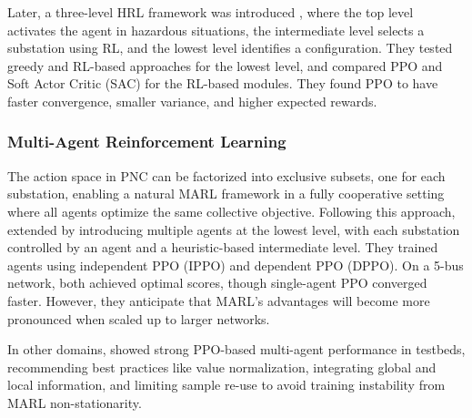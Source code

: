 Later, a three-level HRL framework was introduced \cite{manczak2023hierarchical}, where the top level activates the agent in hazardous situations, the intermediate level selects a substation using RL, and the lowest level identifies a configuration. They tested greedy and RL-based approaches for the lowest level, and compared PPO and Soft Actor Critic (SAC) \cite{haarnoja2018soft} for the RL-based modules. They found PPO to have faster convergence, smaller variance, and higher expected rewards.

\subsubsection{Multi-Agent Reinforcement Learning}
The action space in PNC can be factorized into exclusive subsets, one for each substation, enabling a natural MARL framework in a fully cooperative setting where all agents optimize the same collective objective. Following this approach, \citet{van2023multi} extended \citet{manczak2023hierarchical} by introducing multiple agents at the lowest level, with each substation controlled by an agent and a heuristic-based intermediate level. They trained agents using independent PPO (IPPO) and dependent PPO (DPPO). On a 5-bus network, both achieved optimal scores, though single-agent PPO converged faster. However, they anticipate that MARL's advantages will become more pronounced when scaled up to larger networks.

In other domains, \citet{yu2022surprising} showed strong PPO-based multi-agent performance in testbeds, recommending best practices like value normalization, integrating global and local information, 
and limiting sample re-use to avoid training instability from MARL non-stationarity.



